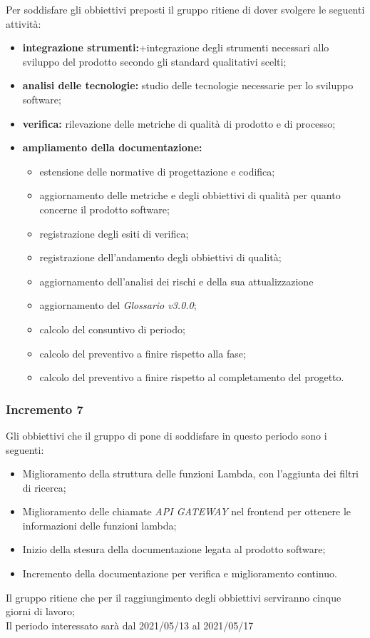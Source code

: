 Per soddisfare gli obbiettivi preposti il gruppo ritiene di dover svolgere le seguenti attività:
\begin{itemize}
    \item\textbf{integrazione strumenti:}+integrazione degli strumenti necessari allo
          sviluppo del prodotto secondo gli standard qualitativi scelti;
    \item\textbf{analisi delle tecnologie:} studio delle tecnologie necessarie per lo sviluppo software;
    \item \textbf{verifica:} rilevazione delle metriche di qualità di prodotto e di processo;
    \item \textbf{ampliamento della documentazione:}
          \begin{itemize}
              \item estensione delle normative di progettazione e codifica;
              \item aggiornamento delle metriche e degli obbiettivi di qualità per quanto concerne il prodotto software;
              \item registrazione degli esiti di verifica;
              \item registrazione dell'andamento degli obbiettivi di qualità;
              \item aggiornamento dell'analisi dei rischi e della sua attualizzazione
              \item aggiornamento del \textit{Glossario v3.0.0};
              \item calcolo del consuntivo di periodo;
              \item calcolo del preventivo a finire rispetto alla fase;
              \item calcolo del preventivo a finire rispetto al completamento del progetto.
          \end{itemize}
\end{itemize}


\subsubsection{Incremento 7}
Gli obbiettivi che il gruppo di pone di soddisfare in questo periodo sono i seguenti:
\begin{itemize}
    \item Miglioramento della struttura delle funzioni Lambda, con l'aggiunta dei filtri di ricerca;
    \item Miglioramento delle chiamate \textit{API GATEWAY} nel frontend per ottenere le informazioni delle funzioni lambda;
    \item Inizio della stesura della documentazione legata al prodotto software;
    \item Incremento della documentazione per verifica e miglioramento continuo.
\end{itemize}
Il gruppo ritiene che per il raggiungimento degli obbiettivi serviranno cinque giorni di lavoro;\\
Il periodo interessato sarà dal 2021/05/13 al 2021/05/17

